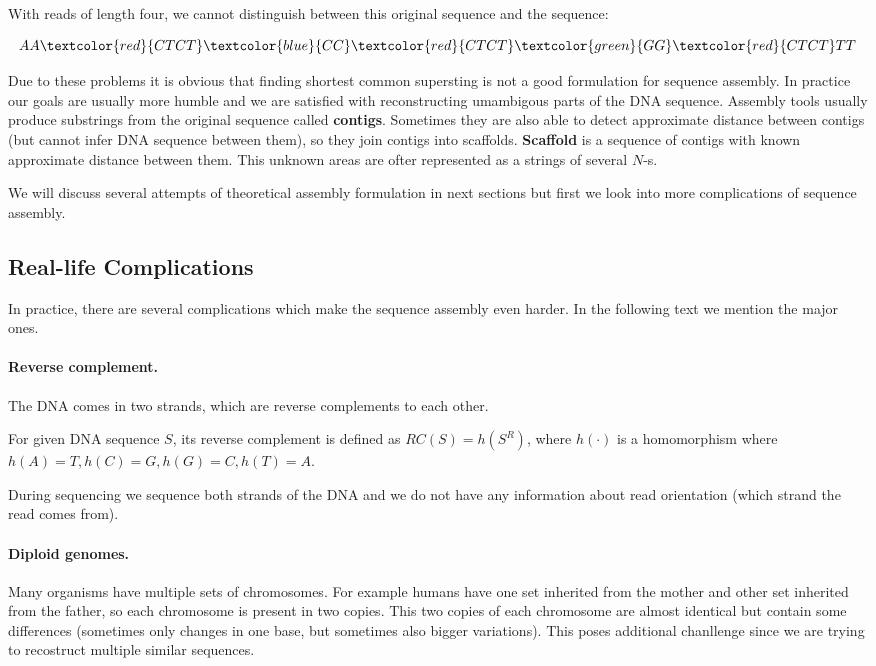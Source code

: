 With reads of length four, we cannot distinguish between this original sequence and
the sequence:

$$AA\textcolor{red}{CTCT}\textcolor{blue}{CC}\textcolor{red}{CTCT}\textcolor{green}{GG}\textcolor{red}{CTCT}TT$$

Due to these problems it is obvious that finding shortest common supersting
is not a good formulation for sequence assembly. 
In practice our goals are usually more humble and we are satisfied with reconstructing
umambigous parts of the DNA sequence. Assembly tools
usually produce substrings from the original sequence called {\bf contigs}.
Sometimes they are also able to detect approximate distance between contigs
(but cannot infer DNA sequence between them), so they join
contigs into scaffolds. {\bf Scaffold} is a sequence of contigs with known
approximate distance between them. 
This unknown areas are ofter represented as a strings of several $N$-s.

We will discuss several attempts of theoretical assembly formulation in
next sections but first we look into more complications of sequence assembly.

\subsection{Real-life Complications}

In practice, there are several complications which make the sequence assembly even harder.
In the following text we mention the major ones.

\paragraph{Reverse complement.} 
The DNA comes in two strands, which are reverse complements to each other.

\begin{definition}
For given DNA sequence $S$, its reverse complement is defined as
$RC(S) = h(S^R)$, where $h(\cdot)$ is a homomorphism where $h(A) = T, h(C) = G,
h(G) = C, h(T) = A$. 
\end{definition}

During sequencing we sequence both strands of the DNA and we do not have
any information about read orientation (which strand the read comes from).

\paragraph{Diploid genomes.}
Many organisms have multiple sets of chromosomes. For example humans have one set
inherited from the mother and other set inherited from the father, so each chromosome
is present in two copies. This two copies of each chromosome are almost identical but
contain some differences (sometimes only changes in one base, but sometimes also
bigger variations). This poses additional chanllenge since we are trying to recostruct
multiple similar sequences.

